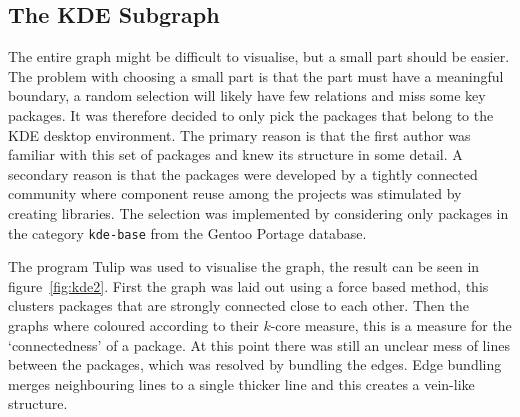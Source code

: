 \documentclass[smallextended,final]{svjour3}
\begin{document}
\subsection{The KDE Subgraph}

The entire graph might be difficult to visualise, but a small part should be easier. The problem with choosing a small part is that the part must have a meaningful boundary, a random selection will likely have few relations and miss some key packages. It was therefore decided to only pick the packages that belong to the KDE desktop environment. The primary reason is that the first author was familiar with this set of packages and knew its structure in some detail. A secondary reason is that the packages were developed by a tightly connected community where component reuse among the projects was stimulated by creating libraries. The selection was implemented by considering only packages in the category \verb|kde-base| from the Gentoo Portage database.

The program Tulip was used to visualise the graph, the result can be seen in figure~\ref{fig:kde2}. First the graph was laid out using a force based method, this clusters packages that are strongly connected close to each other. Then the graphs where coloured according to their $k$-core measure, this is a measure for the `connectedness' of a package. At this point there was still an unclear mess of lines between the packages, which was resolved by bundling the edges. Edge bundling merges neighbouring lines to a single thicker line and this creates a vein-like structure. 
\end{document}
